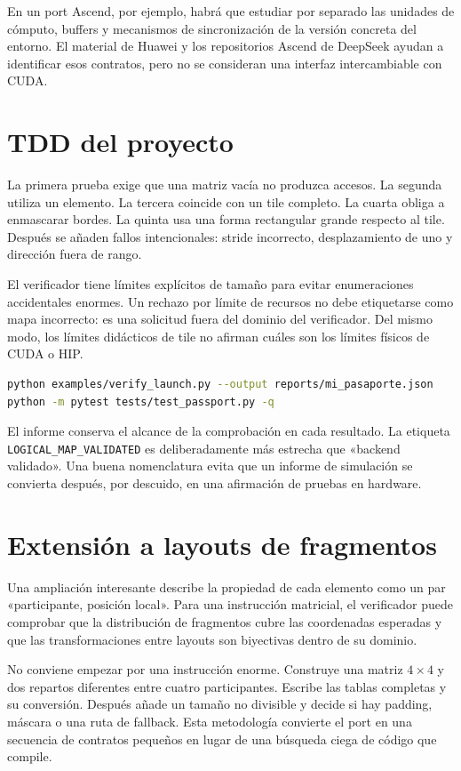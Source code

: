\documentclass[12pt,a4paper,oneside]{report}
\begin{document}
En un port Ascend, por ejemplo, habrá que estudiar por separado las unidades de cómputo, buffers y mecanismos de sincronización de la versión concreta del entorno. El material de Huawei y los repositorios Ascend de DeepSeek ayudan a identificar esos contratos, pero no se consideran una interfaz intercambiable con CUDA. \cite{ascend-samples,deepgemm-ascend,deepep-ascend}

\section{TDD del proyecto}
La primera prueba exige que una matriz vacía no produzca accesos. La segunda utiliza un elemento. La tercera coincide con un tile completo. La cuarta obliga a enmascarar bordes. La quinta usa una forma rectangular grande respecto al tile. Después se añaden fallos intencionales: stride incorrecto, desplazamiento de uno y dirección fuera de rango.

El verificador tiene límites explícitos de tamaño para evitar enumeraciones accidentales enormes. Un rechazo por límite de recursos no debe etiquetarse como mapa incorrecto: es una solicitud fuera del dominio del verificador. Del mismo modo, los límites didácticos de tile no afirman cuáles son los límites físicos de CUDA o HIP.

\begin{lstlisting}[language=bash]
python examples/verify_launch.py --output reports/mi_pasaporte.json
python -m pytest tests/test_passport.py -q
\end{lstlisting}
El informe conserva el alcance de la comprobación en cada resultado. La etiqueta \texttt{LOGICAL\_MAP\_\allowbreak{}VALIDATED} es deliberadamente más estrecha que «backend validado». Una buena nomenclatura evita que un informe de simulación se convierta después, por descuido, en una afirmación de pruebas en hardware.

\section{Extensión a layouts de fragmentos}
Una ampliación interesante describe la propiedad de cada elemento como un par «participante, posición local». Para una instrucción matricial, el verificador puede comprobar que la distribución de fragmentos cubre las coordenadas esperadas y que las transformaciones entre layouts son biyectivas dentro de su dominio.

No conviene empezar por una instrucción enorme. Construye una matriz $4\times4$ y dos repartos diferentes entre cuatro participantes. Escribe las tablas completas y su conversión. Después añade un tamaño no divisible y decide si hay padding, máscara o una ruta de fallback. Esta metodología convierte el port en una secuencia de contratos pequeños en lugar de una búsqueda ciega de código que compile.
\end{document}
